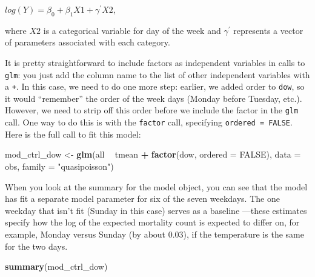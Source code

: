 \documentclass[
]{book}
\newenvironment{Shaded}{\begin{snugshade}}{\end{snugshade}}
\newcommand{\DataTypeTok}[1]{\textcolor[rgb]{0.13,0.29,0.53}{#1}}
\newcommand{\KeywordTok}[1]{\textcolor[rgb]{0.13,0.29,0.53}{\textbf{#1}}}
\newcommand{\NormalTok}[1]{#1}
\newcommand{\OperatorTok}[1]{\textcolor[rgb]{0.81,0.36,0.00}{\textbf{#1}}}
\newcommand{\OtherTok}[1]{\textcolor[rgb]{0.56,0.35,0.01}{#1}}
\newcommand{\StringTok}[1]{\textcolor[rgb]{0.31,0.60,0.02}{#1}}
\begin{document}
\(log(Y)=\beta_{0}+\beta_{1}X1+\gamma^{'}X2\),

where \(X2\) is a categorical variable for day of the week and \(\gamma^{'}\)
represents a vector of parameters associated with each category.

It is pretty straightforward to include factors as independent variables in calls
to \texttt{glm}: you just add the column name to the list of other independent variables
with a \texttt{+}. In this case, we need to do one more step: earlier, we added order to
\texttt{dow}, so it would ``remember'' the order of the week days (Monday before Tuesday,
etc.). However, we need to strip off this order before we include the factor in
the \texttt{glm} call. One way to do this is with the \texttt{factor} call, specifying
\texttt{ordered\ =\ FALSE}. Here is the full call to fit this model:

\begin{Shaded}
\begin{Highlighting}[]
\NormalTok{mod_ctrl_dow <-}\StringTok{ }\KeywordTok{glm}\NormalTok{(all }\OperatorTok{~}\StringTok{ }\NormalTok{tmean }\OperatorTok{+}\StringTok{ }\KeywordTok{factor}\NormalTok{(dow, }\DataTypeTok{ordered =} \OtherTok{FALSE}\NormalTok{), }
                    \DataTypeTok{data =}\NormalTok{ obs, }\DataTypeTok{family =} \StringTok{"quasipoisson"}\NormalTok{)}
\end{Highlighting}
\end{Shaded}

When you look at the summary for the model object, you can see that the
model has fit a separate model parameter for six of the seven weekdays. The one
weekday that isn't fit (Sunday in this case) serves as a baseline ---these
estimates specify how the log of the expected mortality count is expected to
differ on, for example, Monday versus Sunday (by about 0.03), if the temperature
is the same for the two days.

\begin{Shaded}
\begin{Highlighting}[]
\KeywordTok{summary}\NormalTok{(mod_ctrl_dow)}
\end{Highlighting}
\end{Shaded}
\end{document}
